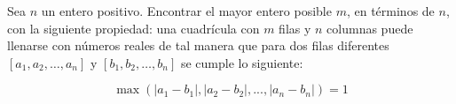 Sea $n$ un entero positivo. Encontrar el mayor entero posible $m$, en términos de $n$, con la siguiente propiedad: una cuadrícula con $m$ filas y $n$ columnas puede llenarse con números reales de tal manera que para dos filas diferentes $\left[ {{a_1},{a_2},\ldots,{a_n}}\right]$ y $\left[ {{b_1},{b_2},\ldots,{b_n}} \right]$ se cumple lo siguiente:

\[\max\left( {\left| {{a_1} - {b_1}} \right|,\left| {{a_2} - {b_2}} \right|,...,\left| {{a_n} - {b_n}} \right|} \right) = 1\]